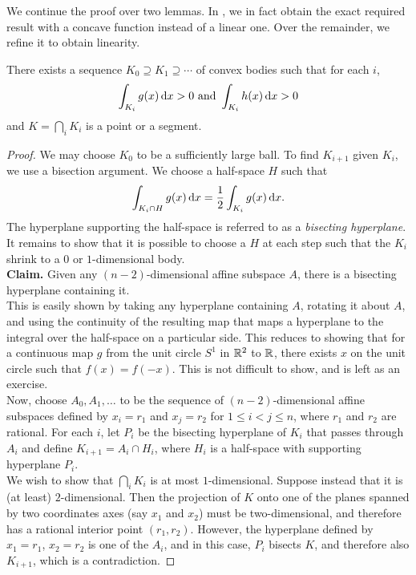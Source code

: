 We continue the proof over two lemmas. In , we in fact obtain the exact required result with a concave function instead of a linear one. Over the remainder, we refine it to obtain linearity.

\begin{lemma}
\label{localization lemma lemma 1}
	There exists a sequence $K_0\supseteq K_1 \supseteq \cdots$ of convex bodies such that for each $i$,
	\[ \int_{K_i} g(x)\operatorname{d}\!{x} > 0 \text{ and } \int_{K_i} h(x)\operatorname{d}\!{x} > 0 \]
	and $K=\bigcap_i K_i$ is a point or a segment.
\end{lemma}
\begin{proof}
	We may choose $K_0$ to be a sufficiently large ball. To find $K_{i+1}$ given $K_i$, we use a bisection argument. We choose a half-space $H$ such that
	\[ \int_{K_i\cap H} g(x)\operatorname{d}\!{x} = \frac{1}{2} \int_{K_i} g(x)\operatorname{d}\!{x}. \]
	The hyperplane supporting the half-space is referred to as a \textit{bisecting hyperplane}. It remains to show that it is possible to choose a $H$ at each step such that the $K_i$ shrink to a $0$ or $1$-dimensional body.\\

	\textbf{Claim.} Given any $(n-2)$-dimensional affine subspace $A$, there is a bisecting hyperplane containing it.\\
	This is easily shown by taking any hyperplane containing $A$, rotating it about $A$, and using the continuity of the resulting map that maps a hyperplane to the integral over the half-space on a particular side. This reduces to showing that for a continuous map $g$ from the unit circle $S^1$ in $\mathbb{R}^2$ to $\mathbb{R}$, there exists $x$ on the unit circle such that $f(x)=f(-x)$. This is not difficult to show, and is left as an exercise.\\%

	Now, choose $A_0,A_1,\ldots$ to be the sequence of $(n-2)$-dimensional affine subspaces defined by $x_i=r_1$ and $x_j=r_2$ for $1\leq i<j\leq n$, where $r_1$ and $r_2$ are rational. For each $i$, let $P_i$ be the bisecting hyperplane of $K_i$ that passes through $A_i$ and define $K_{i+1}=A_i\cap H_i$, where $H_i$ is a half-space with supporting hyperplane $P_i$.\\
	We wish to show that $\bigcap_i K_i$ is at most $1$-dimensional. Suppose instead that it is (at least) $2$-dimensional. Then the projection of $K$ onto one of the planes spanned by two coordinates axes (say $x_1$ and $x_2$) must be two-dimensional, and therefore has a rational interior point $(r_1,r_2)$. However, the hyperplane defined by $x_1=r_1$, $x_2=r_2$ is one of the $A_i$, and in this case, $P_i$ bisects $K$, and therefore also $K_{i+1}$, which is a contradiction.
\end{proof}

